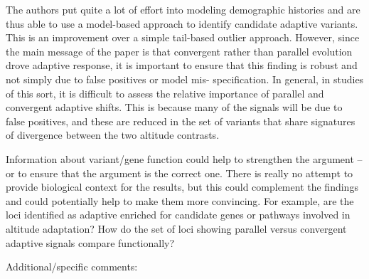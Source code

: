 \documentclass[onecolumn,oneside,letterpaper]{article}
\begin{document}
The authors put quite a lot of effort into modeling demographic histories and are thus able to use a model-based approach to identify candidate adaptive variants.  This is an improvement over a simple tail-based outlier approach.  However, since the main message of the paper is that convergent rather than parallel evolution drove adaptive response, it is important to ensure that this finding is robust and not simply due to false positives or model mis- specification.  In general, in studies of this sort, it is difficult to assess the relative importance of parallel and convergent adaptive shifts. This is because many of the signals will be due to false positives, and these are reduced in the set of variants that share signatures of divergence between the two altitude contrasts.  

Information about variant/gene function could help to strengthen the argument -- or to ensure that the argument is the correct one.  There is really no attempt to provide biological context for the results, but this could complement the findings and could potentially help to make them more convincing.  For example, are the loci identified as adaptive enriched for candidate genes or pathways involved in altitude adaptation? How do the set of loci showing parallel versus convergent adaptive signals compare functionally?   

Additional/specific comments:  
\end{document}
